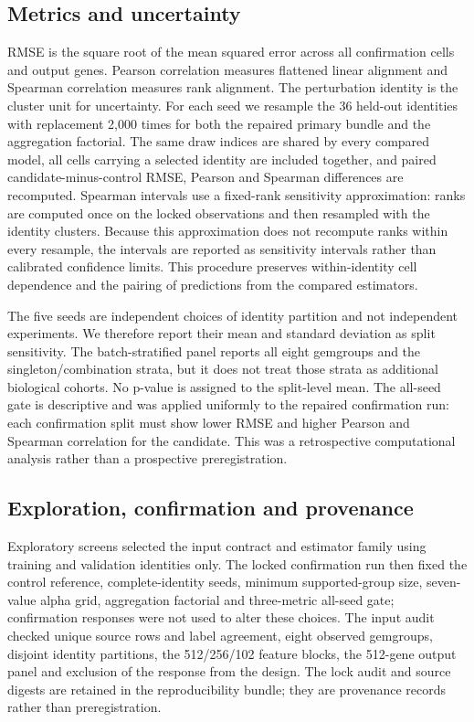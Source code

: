 \documentclass[10pt]{article}
\begin{document}
\subsection{Metrics and uncertainty}
RMSE is the square root of the mean squared error across all confirmation cells and output genes. Pearson correlation measures flattened linear alignment and Spearman correlation measures rank alignment. The perturbation identity is the cluster unit for uncertainty. For each seed we resample the 36 held-out identities with replacement 2,000 times for both the repaired primary bundle and the aggregation factorial. The same draw indices are shared by every compared model, all cells carrying a selected identity are included together, and paired candidate-minus-control RMSE, Pearson and Spearman differences are recomputed. Spearman intervals use a fixed-rank sensitivity approximation: ranks are computed once on the locked observations and then resampled with the identity clusters. Because this approximation does not recompute ranks within every resample, the intervals are reported as sensitivity intervals rather than calibrated confidence limits. This procedure preserves within-identity cell dependence and the pairing of predictions from the compared estimators.

The five seeds are independent choices of identity partition and not independent experiments. We therefore report their mean and standard deviation as split sensitivity. The batch-stratified panel reports all eight gemgroups and the singleton/combination strata, but it does not treat those strata as additional biological cohorts. No p-value is assigned to the split-level mean. The all-seed gate is descriptive and was applied uniformly to the repaired confirmation run: each confirmation split must show lower RMSE and higher Pearson and Spearman correlation for the candidate. This was a retrospective computational analysis rather than a prospective preregistration.

\subsection{Exploration, confirmation and provenance}
Exploratory screens selected the input contract and estimator family using training and validation identities only. The locked confirmation run then fixed the control reference, complete-identity seeds, minimum supported-group size, seven-value alpha grid, aggregation factorial and three-metric all-seed gate; confirmation responses were not used to alter these choices. The input audit checked unique source rows and label agreement, eight observed gemgroups, disjoint identity partitions, the 512/256/102 feature blocks, the 512-gene output panel and exclusion of the response from the design. The lock audit and source digests are retained in the reproducibility bundle; they are provenance records rather than preregistration.
\end{document}
